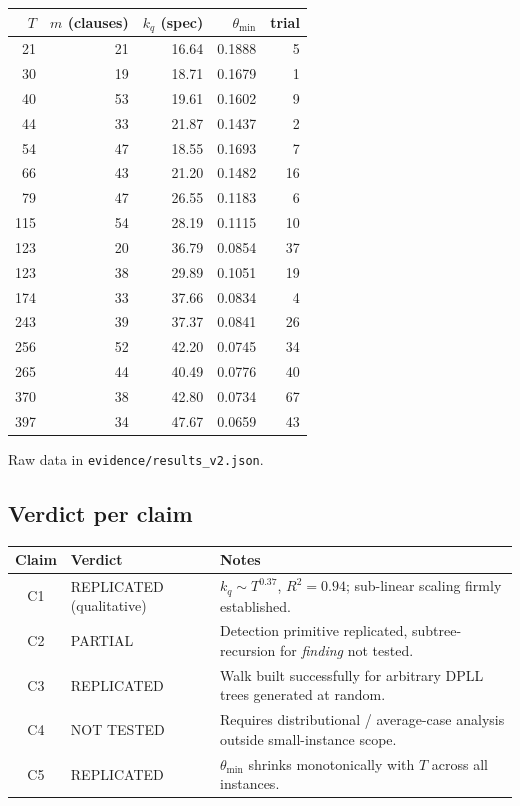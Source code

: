 \documentclass[11pt]{article}
\begin{document}
\begin{center}
\begin{tabular}{rrrrr}
\toprule
$T$ & $m$ (clauses) & $k_q$ (spec) & $\theta_{\min}$ & trial \\
\midrule
21 & 21 & 16.64 & 0.1888 & 5 \\
30 & 19 & 18.71 & 0.1679 & 1 \\
40 & 53 & 19.61 & 0.1602 & 9 \\
44 & 33 & 21.87 & 0.1437 & 2 \\
54 & 47 & 18.55 & 0.1693 & 7 \\
66 & 43 & 21.20 & 0.1482 & 16 \\
79 & 47 & 26.55 & 0.1183 & 6 \\
115 & 54 & 28.19 & 0.1115 & 10 \\
123 & 20 & 36.79 & 0.0854 & 37 \\
123 & 38 & 29.89 & 0.1051 & 19 \\
174 & 33 & 37.66 & 0.0834 & 4 \\
243 & 39 & 37.37 & 0.0841 & 26 \\
256 & 52 & 42.20 & 0.0745 & 34 \\
265 & 44 & 40.49 & 0.0776 & 40 \\
370 & 38 & 42.80 & 0.0734 & 67 \\
397 & 34 & 47.67 & 0.0659 & 43 \\
\bottomrule
\end{tabular}
\end{center}

Raw data in \texttt{evidence/results\_v2.json}.

\subsection{Verdict per claim}

\begin{center}
\begin{tabular}{cll}
\toprule
Claim & Verdict & Notes \\
\midrule
C1 & REPLICATED (qualitative) & $k_q \sim T^{0.37}$, $R^2 {=} 0.94$; sub-linear scaling firmly established. \\
C2 & PARTIAL              & Detection primitive replicated, subtree-recursion for \emph{finding} not tested. \\
C3 & REPLICATED           & Walk built successfully for arbitrary DPLL trees generated at random. \\
C4 & NOT TESTED           & Requires distributional / average-case analysis outside small-instance scope. \\
C5 & REPLICATED           & $\theta_{\min}$ shrinks monotonically with $T$ across all instances. \\
\bottomrule
\end{tabular}
\end{center}
\end{document}
